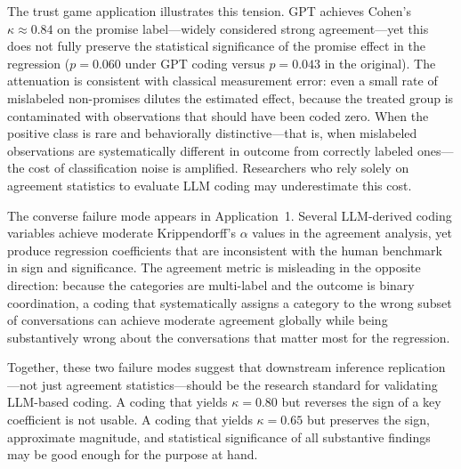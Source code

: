 \documentclass[11pt]{article}
\begin{document}
\begin{sloppypar}
The trust game application illustrates this tension. GPT achieves Cohen's $\kappa \approx 0.84$ on the promise label---widely considered strong agreement---yet this does not fully preserve the statistical significance of the promise effect in the regression ($p = 0.060$ under GPT coding versus $p = 0.043$ in the original). The attenuation is consistent with classical measurement error: even a small rate of mislabeled non-promises dilutes the estimated effect, because the treated group is contaminated with observations that should have been coded zero. When the positive class is rare and behaviorally distinctive---that is, when mislabeled observations are systematically different in outcome from correctly labeled ones---the cost of classification noise is amplified. Researchers who rely solely on agreement statistics to evaluate LLM coding may underestimate this cost.

The converse failure mode appears in Application~1. Several LLM-derived coding variables achieve moderate Krippendorff's $\alpha$ values in the agreement analysis, yet produce regression coefficients that are inconsistent with the human benchmark in sign and significance. The agreement metric is misleading in the opposite direction: because the categories are multi-label and the outcome is binary coordination, a coding that systematically assigns a category to the wrong subset of conversations can achieve moderate agreement globally while being substantively wrong about the conversations that matter most for the regression.


Together, these two failure modes suggest that downstream inference replication---not just agreement statistics---should be the research standard for validating LLM-based coding. A coding that yields $\kappa = 0.80$ but reverses the sign of a key coefficient is not usable. A coding that yields $\kappa = 0.65$ but preserves the sign, approximate magnitude, and statistical significance of all substantive findings may be good enough for the purpose at hand.


\end{sloppypar}
\end{document}

